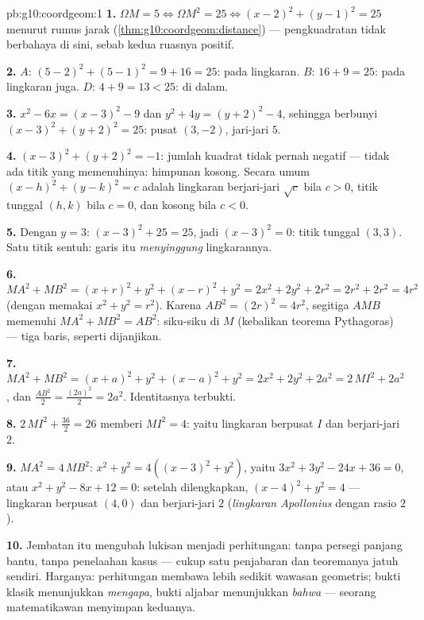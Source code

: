 \begin{solution}{pb:g10:coordgeom:1}
\textbf{1.} $\Omega M = 5 \iff \Omega M^2 = 25 \iff
(x - 2)^2 + (y - 1)^2 = 25$ menurut rumus jarak
(\cref{thm:g10:coordgeom:distance}) --- pengkuadratan tidak berbahaya
di sini, sebab kedua ruasnya positif.

\textbf{2.} $A$: $(5-2)^2 + (5-1)^2 = 9 + 16 = 25$: pada
lingkaran. $B$: $16 + 9 = 25$: pada lingkaran juga. $D$: $4 + 9 = 13 < 25$:
di dalam.

\textbf{3.} $x^2 - 6x = (x - 3)^2 - 9$ dan
$y^2 + 4y = (y + 2)^2 - 4$, sehingga  berbunyi
$(x - 3)^2 + (y + 2)^2 = 25$: pusat $(3, -2)$, jari-jari $5$.

\textbf{4.} $(x - 3)^2 + (y + 2)^2 = -1$: jumlah kuadrat tidak
pernah negatif --- tidak ada titik yang memenuhinya: himpunan kosong.
Secara umum $(x - h)^2 + (y - k)^2 = c$ adalah lingkaran berjari-jari
$\sqrt c$ bila $c > 0$, titik tunggal $(h, k)$ bila $c = 0$, dan
kosong bila $c < 0$.

\textbf{5.} Dengan $y = 3$: $(x - 3)^2 + 25 = 25$, jadi
$(x - 3)^2 = 0$: titik tunggal $(3, 3)$. Satu titik sentuh:
garis itu \emph{menyinggung} lingkarannya.

\textbf{6.} $MA^2 + MB^2 = (x + r)^2 + y^2 + (x - r)^2 + y^2
= 2x^2 + 2y^2 + 2r^2 = 2r^2 + 2r^2 = 4r^2$ (dengan memakai
$x^2 + y^2 = r^2$). Karena $AB^2 = (2r)^2 = 4r^2$, segitiga
$AMB$ memenuhi $MA^2 + MB^2 = AB^2$: siku-siku di $M$
(kebalikan teorema Pythagoras) --- tiga baris, seperti dijanjikan.

\textbf{7.} $MA^2 + MB^2 = (x + a)^2 + y^2 + (x - a)^2 + y^2
= 2x^2 + 2y^2 + 2a^2 = 2\,MI^2 + 2a^2$, dan
$\frac{AB^2}{2} = \frac{(2a)^2}{2} = 2a^2$. Identitasnya terbukti.

\textbf{8.} $2\,MI^2 + \frac{36}{2} = 26$ memberi $MI^2 = 4$: yaitu
lingkaran berpusat  $I$ dan berjari-jari $2$.

\textbf{9.} $MA^2 = 4\,MB^2$:
$x^2 + y^2 = 4\left((x - 3)^2 + y^2\right)$, yaitu
$3x^2 + 3y^2 - 24x + 36 = 0$, atau
$x^2 + y^2 - 8x + 12 = 0$: setelah dilengkapkan,
$(x - 4)^2 + y^2 = 4$ --- lingkaran berpusat $(4, 0)$ dan
berjari-jari $2$ (\emph{lingkaran Apollonius} dengan rasio $2$).

\textbf{10.} Jembatan itu mengubah lukisan menjadi
perhitungan: tanpa persegi panjang bantu, tanpa penelaahan kasus ---
cukup satu penjabaran dan teoremanya jatuh sendiri. Harganya: perhitungan
membawa lebih sedikit wawasan geometris; bukti klasik menunjukkan
\emph{mengapa}, bukti aljabar menunjukkan \emph{bahwa} --- seorang
matematikawan menyimpan keduanya.


\end{solution}
